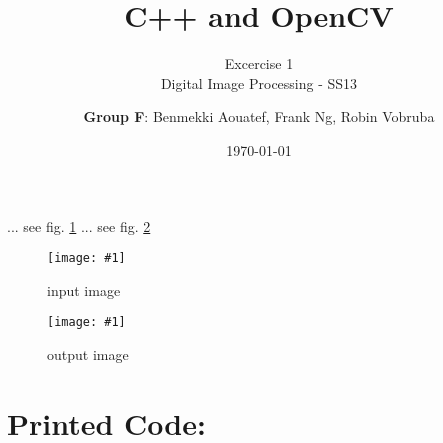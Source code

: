 \documentclass[a4paper,headings=small]{scrartcl}
\title{C++ and OpenCV}
\subtitle{Excercise 1 \\ Digital Image Processing - SS13}
\author{\textbf{Group F}: Benmekki Aouatef, Frank Ng, Robin Vobruba}
\date{\today}
\numberwithin{equation}{section} %
\numberwithin{figure}{section}   %
\newcommand{\image}[3]{
	\begin{figure}[htbp]
		\centering
		\texttt{[image: \#1]}
		\caption{#3}
		\label{fig:#1}
	\end{figure}
}
\newcommand{\imgRoot}{../resources/img}
\newcommand{\imgGeneratedRoot}{../../../target}
\begin{document}
\maketitle

... see fig. \ref{fig:\imgRoot/input.jpg}
... see fig. \ref{fig:\imgGeneratedRoot/output.jpg}


\image{\imgRoot/input.jpg}{0.9}{%
		input image}

\image{\imgGeneratedRoot/output.jpg}{0.9}{%
		output image}


\newpage
\section{Printed Code:}


\end{document}
